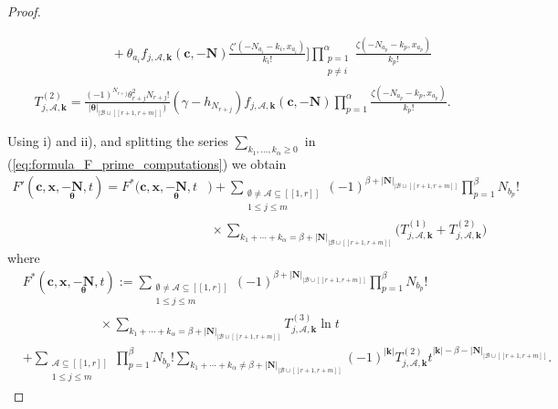 \documentclass[a4paper]{amsart}
\theoremstyle{remark}
\theoremstyle{definition}
\begin{document}
\begin{proof}
\begin{enumerate}
\begin{align}
    & \qquad \qquad \qquad + \theta_{a_i} f_{j,\mathcal{A},\mathbf{k}}(\mathbf{c},-\mathbf{N}) \frac{\zeta'(-N_{a_i}-k_i,x_{a_i})}{k_{i}!} \Biggr] \prod_{\substack{p=1 \\ p \neq i}}^{\alpha} \frac{\zeta(-N_{a_p}-k_p,x_{a_p})}{k_p!} \nonumber \\
    &T^{(2)}_{j,\mathcal{A},\mathbf{k}}=\frac{(-1)^{N_{r+j}}\theta_{r+j}^2N_{r+j}!}{|\bm{\theta}|_{|\mathcal{B}\cup [\![ r+1,r+m ]\!]})}\left(\gamma-h_{N_{r+j}} \right) f_{j,\mathcal{A},\mathbf{k}}(\mathbf{c},-\mathbf{N}) \prod_{p=1}^{\alpha} \frac{\zeta(-N_{a_p}-k_p,x_{a_p})}{k_p!}. \label{eq:formula_T_2}
\end{align}
\end{enumerate}

Using i) and ii), and splitting the series $\sum_{k_1,\ldots,k_{\alpha} \geq 0}$ in (\ref{eq:formula_F_prime_computations}) we obtain
\begin{align}
    F'(\mathbf{c},\mathbf{x},\underset{\bm{\theta}}{-\mathbf{N}},t) = F^*(\mathbf{c},\mathbf{x},\underset{\bm{\theta}}{-\mathbf{N}},t&) + \sum_{\substack{\emptyset \neq \mathcal{A} \subseteq [\![1,r]\!] \\ 1 \leq j \leq m}} (-1)^{\beta+|\mathbf{N}|_{|\mathcal{B}\cup [\![ r+1,r+m ]\!]}} \prod_{p=1}^{\beta} N_{b_p}! \label{eq:formula_F_prime_computations_bis} \\
    & \ \times \sum_{k_1+\cdots+k_{\alpha}=\beta+|\mathbf{N}|_{|\mathcal{B}\cup [\![ r+1,r+m ]\!]}} \big(T^{(1)}_{j,\mathcal{A},\mathbf{k}}+T^{(2)}_{j,\mathcal{A},\mathbf{k}}\big) \nonumber
\end{align}
where
\begin{align*}
    &F^*(\mathbf{c},\mathbf{x},\underset{\bm{\theta}}{-\mathbf{N}},t) := \sum_{\substack{\emptyset \neq \mathcal{A} \subseteq [\![1,r]\!] \\ 1 \leq j \leq m}} (-1)^{\beta+|\mathbf{N}|_{|\mathcal{B}\cup [\![ r+1,r+m ]\!]}} \prod_{p=1}^{\beta} N_{b_p}! \\
    & \qquad \qquad \qquad \times \sum_{k_1+\cdots+k_{\alpha}=\beta+|\mathbf{N}|_{|\mathcal{B}\cup [\![ r+1,r+m ]\!]}} T^{(3)}_{j,\mathcal{A},\mathbf{k}} \ln t \\
    & + \sum_{\substack{\mathcal{A} \subseteq [\![1,r]\!] \\ 1 \leq j \leq m}} \prod_{p=1}^{\beta} N_{b_p}! \sum_{k_1+\cdots+k_{\alpha} \neq \beta+|\mathbf{N}|_{|\mathcal{B}\cup [\![ r+1,r+m ]\!]}} (-1)^{|\mathbf{k}|} T^{(2)}_{j,\mathcal{A},\mathbf{k}} t^{|\mathbf{k}|-\beta-|\mathbf{N}|_{|\mathcal{B}\cup [\![ r+1,r+m ]\!]}}.

\end{align*}
\end{proof}
\end{document}
